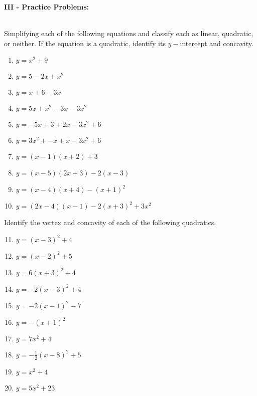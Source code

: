\documentclass[12pt]{article}
\theoremstyle{definition}
\begin{document}
{\bf III - Practice Problems:}\\
\ \par
Simplifying each of the following equations and classify each as linear, quadratic, or neither. If the equation is a quadratic, identify its $y-$intercept and concavity.
\begin{multicols}{2}
\begin{enumerate}
  \item $y=x^2 + 9$
  \item $y=5-2x+x^2$
  \item $y=x+6-3x$
  \item $y=5x+x^2-3x-3x^2$
  \item $y=-5x+3+2x-3x^2+6$
  \item $y=3x^2+-x+x-3x^2+6$
  \item $y=(x-1)(x+2)+3$
  \item $y=(x-5)(2x+3)-2(x-3)$
  \item $y=(x-4)(x+4)-(x+1)^2$
  \item $y=(2x-4)(x-1)-2(x+3)^2+3x^2$
\end{enumerate}
\end{multicols}

Identify the vertex and concavity of each of the following quadratics.

\begin{multicols}{3}
\begin{enumerate}
\setcounter{enumi}{10}
	\item $y=(x-3)^2+4$
  \item $y=(x-2)^2+5$
  \item $y=6(x+3)^2+4$
  \item $y=-2(x-3)^2+4$
  \item $y=-2(x-1)^2-7$
  \item $y=-(x+1)^2$
  \item $y=7x^2+4$
  \item $y=-\frac{1}{2}(x-8)^2+5$
  \item $y=x^2+4$
  \item $y=5x^2+23$
\end{enumerate}
\end{multicols}
\newpage
\ \newpage
\end{document}
